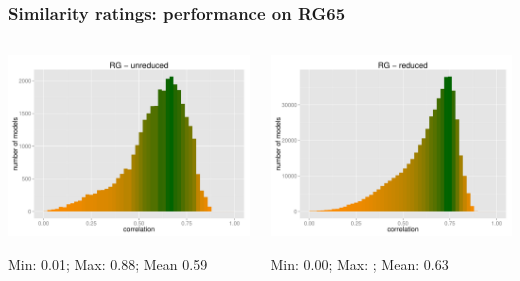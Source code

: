 \documentclass[t]{beamer} %
\begin{document}
\begin{frame}
  \frametitle{Similarity ratings: performance on RG65}
  \centering
  
  \begin{columns}
    \begin{column}{0.5\textwidth}
      \centering
      \hspace*{-18pt}   \includegraphics[scale=0.30]{img/lapesa_hist_rg_unreduced}
      \begin{block}{}\footnotesize \centering
        Min:  0.01; Max:  0.88;  Mean 0.59 \\
      \end{block}
    \end{column}
    \begin{column}{0.5\textwidth}
      \hspace*{-18pt} 
      \includegraphics[scale=0.30]{img/lapesa_hist_rg_reduced}
      \begin{block}{}\footnotesize \centering
        Min:  0.00; Max: ;  Mean: 0.63\\
      \end{block}
    \end{column}
  \end{columns}
 
\end{frame}
\end{document}
